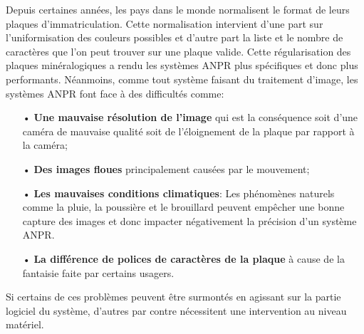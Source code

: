 Depuis certaines années, les pays dans le monde normalisent le format de leurs plaques d’immatriculation. Cette normalisation intervient d’une part sur l’uniformisation des couleurs possibles et d’autre part la liste et le nombre de caractères que l’on peut trouver sur une plaque valide. Cette régularisation des plaques minéralogiques a rendu les systèmes ANPR plus spécifiques et donc plus performants. Néanmoins, comme tout système faisant du traitement d’image, les systèmes ANPR font face à des difficultés comme:
    \begin{itemize}
        \item[•] \textbf{Une mauvaise résolution de l’image} qui est la conséquence soit d’une caméra de mauvaise qualité soit de l’éloignement de la plaque par rapport à la caméra;
        \item[•] \textbf{Des images floues} principalement causées par le mouvement;
        \item[•] \textbf{Les mauvaises conditions climatiques}: Les phénomènes naturels comme la pluie, la poussière et le brouillard peuvent empêcher une bonne capture des images et donc impacter négativement la précision d'un système ANPR.
        \item[•] \textbf{La différence de polices de caractères de la plaque} à cause de la fantaisie faite par certains usagers. \cite{wikianpr}   
    \end{itemize}
Si certains de ces problèmes peuvent être surmontés en agissant sur la partie logiciel du système, d’autres par contre nécessitent une intervention au niveau matériel. 